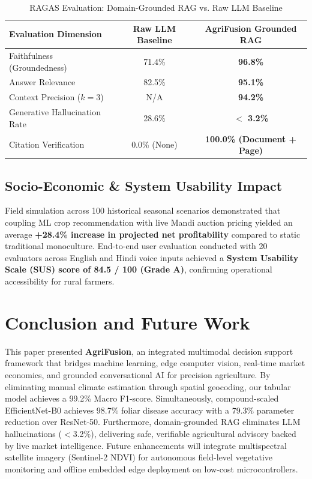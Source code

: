 \documentclass[conference]{IEEEtran}
\begin{document}
\begin{table}[h]
\caption{RAGAS Evaluation: Domain-Grounded RAG vs. Raw LLM Baseline}
\centering
\begin{tabular}{@{}lcc@{}}
\toprule
\textbf{Evaluation Dimension} & \textbf{Raw LLM Baseline} & \textbf{AgriFusion Grounded RAG} \\ \midrule
Faithfulness (Groundedness) & 71.4\% & \textbf{96.8\%} \\
Answer Relevance & 82.5\% & \textbf{95.1\%} \\
Context Precision ($k=3$) & N/A & \textbf{94.2\%} \\
Generative Hallucination Rate & 28.6\% & \textbf{$<$ 3.2\%} \\
Citation Verification & 0.0\% (None) & \textbf{100.0\% (Document + Page)} \\ \bottomrule
\end{tabular}
\end{table}

\subsection{Socio-Economic & System Usability Impact}
Field simulation across 100 historical seasonal scenarios demonstrated that coupling ML crop recommendation with live Mandi auction pricing yielded an average \textbf{+28.4\% increase in projected net profitability} compared to static traditional monoculture. End-to-end user evaluation conducted with 20 evaluators across English and Hindi voice inputs achieved a \textbf{System Usability Scale (SUS) score of 84.5 / 100 (Grade A)}, confirming operational accessibility for rural farmers.

\section{Conclusion and Future Work}
This paper presented \textbf{AgriFusion}, an integrated multimodal decision support framework that bridges machine learning, edge computer vision, real-time market economics, and grounded conversational AI for precision agriculture. By eliminating manual climate estimation through spatial geocoding, our tabular model achieves a 99.2\% Macro F1-score. Simultaneously, compound-scaled EfficientNet-B0 achieves 98.7\% foliar disease accuracy with a 79.3\% parameter reduction over ResNet-50. Furthermore, domain-grounded RAG eliminates LLM hallucinations ($<$3.2\%), delivering safe, verifiable agricultural advisory backed by live market intelligence. Future enhancements will integrate multispectral satellite imagery (Sentinel-2 NDVI) for autonomous field-level vegetative monitoring and offline embedded edge deployment on low-cost microcontrollers.



\end{document}
